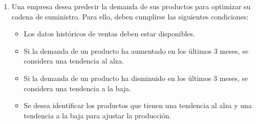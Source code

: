 \documentclass[12pt]{article}
\begin{document}
\begin{itemize}
\begin{enumerate}
                \item Una empresa desea predecir la demanda de sus productos para optimizar su cadena de suministro. Para ello, deben cumplirse las siguientes condiciones:
                    \begin{itemize}
                        \item Los datos históricos de ventas deben estar disponibles.
                        \item Si la demanda de un producto ha aumentado en los últimos 3 meses, se considera una tendencia al alza.
                        \item Si la demanda de un producto ha disminuido en los últimos 3 meses, se considera una tendencia a la baja.
                        \item Se desea identificar los productos que tienen una tendencia al alza y una tendencia a la baja para ajustar la producción.
                    \end{itemize}
            \end{enumerate}
        \end{itemize}
\end{document}
